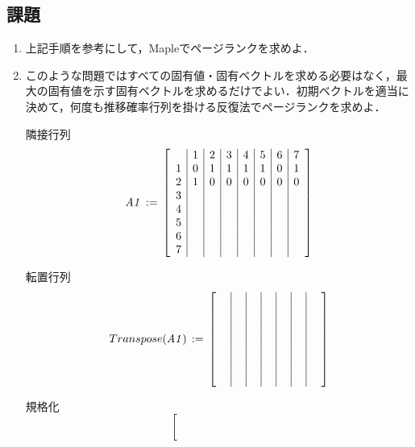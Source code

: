\subsection{課題}
\begin{enumerate}
\item 上記手順を参考にして，Mapleでページランクを求めよ．
\item このような問題ではすべての固有値・固有ベクトルを求める必要はなく，最大の固有値を示す固有ベクトルを求めるだけでよい．初期ベクトルを適当に決めて，何度も推移確率行列を掛ける反復法でページランクを求めよ．
\end{enumerate}
\begin{itemize}
\item[隣接行列]
\begin{equation*}
{\it A1}\, := \, \left[ \begin {array}{c|c|c|c|c|c|c|c} 
 &1&2&3&4&5&6&7\\
1&0&1&1&1&1&0&1\\
2&1&0&0&0&0&0&0\\
3& & & & & & & \\
4& & & & & & & \\
5& & & & & & & \\
6& & & & & & & \\
7& & & & & & & 
\end {array} \right] 
\end{equation*}
\item[転置行列]
\begin{equation*}
{Transpose}({\it A1})\, := \, \left[ \begin {array}{c|c|c|c|c|c|c} 
\, \, &\, \, &\, \, &\, \, &\, \, &\, \, &\, \, \\
 & & & & & & \\
 & & & & & & \\
 & & & & & & \\
 & & & & & & \\
 & & & & & & \\
 & & & & & & 
\end {array} \right] 
\end{equation*}
\item[規格化]
\begin{equation*}
\left[ \begin {array}{c|c|c|c|c|c|c} 
\, \, &\, \, &\, \, &\, \, &\, \, &\, \, &\, \, \\
 & & & & & & \\
 & & & & & & \\
 & & & & & & \\

\end{array}
\end{equation*}
\end{itemize}

